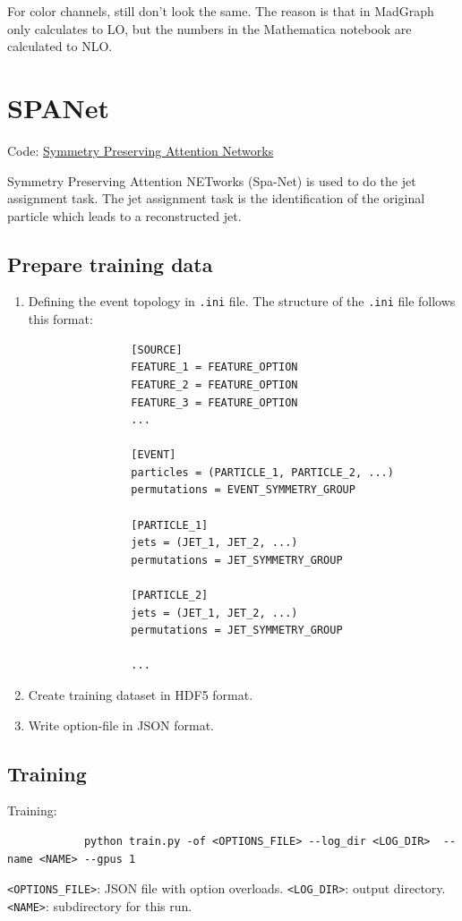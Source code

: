 \documentclass[12pt]{article}
\begin{document}
	For color channels, still don't look the same. The reason is that in MadGraph only calculates to LO, but the numbers in the Mathematica notebook are calculated to NLO.
\section{SPANet}%
\label{sec:spanet}
	Code: \href{https://github.com/Alexanders101/SPANet}{Symmetry Preserving Attention Networks}

	Symmetry Preserving Attention NETworks (Spa-Net) is used to do the jet assignment task. The jet assignment task is the identification of the original particle which leads to a reconstructed jet.

	\subsection{Prepare training data}%
	\label{sub:prepare_training_data}
		\begin{enumerate}
			\item Defining the event topology in \verb+.ini+ file. The structure of the \verb+.ini+ file follows this format:

			\begin{verbatim}
				[SOURCE]
				FEATURE_1 = FEATURE_OPTION
				FEATURE_2 = FEATURE_OPTION
				FEATURE_3 = FEATURE_OPTION
				...

				[EVENT]
				particles = (PARTICLE_1, PARTICLE_2, ...)
				permutations = EVENT_SYMMETRY_GROUP

				[PARTICLE_1]
				jets = (JET_1, JET_2, ...)
				permutations = JET_SYMMETRY_GROUP

				[PARTICLE_2]
				jets = (JET_1, JET_2, ...)
				permutations = JET_SYMMETRY_GROUP

				...
			\end{verbatim}

			\item Create training dataset in HDF5 format.

			\item Write option-file in JSON format.

		\end{enumerate}
	\subsection{Training}%
	\label{sub:training}
		Training:
		\begin{verbatim}
			python train.py -of <OPTIONS_FILE> --log_dir <LOG_DIR>  --name <NAME> --gpus 1
		\end{verbatim}
		\verb+<OPTIONS_FILE>+: JSON file with option overloads. \verb+<LOG_DIR>+: output directory. \verb+<NAME>+: subdirectory for this run. 
\end{document}
